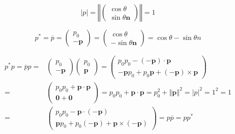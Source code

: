 \documentclass[
]{book}
\theoremstyle{definition}
\theoremstyle{definition}
\theoremstyle{definition}
\theoremstyle{definition}
\theoremstyle{remark}
\begin{document}
\[
\left|p\right|=\left\Vert \begin{pmatrix}\cos\theta\\
\sin\theta\boldsymbol{n}
\end{pmatrix}\right\Vert =1
\]

\[
p^{*}=\overline{p}=\begin{pmatrix}p_{{\scriptscriptstyle 0}}\\
-\boldsymbol{p}
\end{pmatrix}=\begin{pmatrix}\cos\theta\\
-\sin\theta\boldsymbol{n}
\end{pmatrix}=\cos\theta-\sin\theta n
\]

\[
\begin{aligned}
p^{*}p=\overline{p}p= & \begin{pmatrix}p_{{\scriptscriptstyle 0}}\\
-\boldsymbol{p}
\end{pmatrix}\begin{pmatrix}p_{{\scriptscriptstyle 0}}\\
\boldsymbol{p}
\end{pmatrix}=\begin{pmatrix}p_{{\scriptscriptstyle 0}}p_{{\scriptscriptstyle 0}}-\left(-\boldsymbol{p}\right)\cdot\boldsymbol{p}\\
-\boldsymbol{p}p_{{\scriptscriptstyle 0}}+p_{{\scriptscriptstyle 0}}\boldsymbol{p}+\left(-\boldsymbol{p}\right)\times\boldsymbol{p}
\end{pmatrix}\\
= & \begin{pmatrix}p_{{\scriptscriptstyle 0}}p_{{\scriptscriptstyle 0}}+\boldsymbol{p}\cdot\boldsymbol{p}\\
\boldsymbol{0}+\boldsymbol{0}
\end{pmatrix}=p_{{\scriptscriptstyle 0}}p_{{\scriptscriptstyle 0}}+\boldsymbol{p}\cdot\boldsymbol{p}=p_{{\scriptscriptstyle 0}}^{2}+\left\Vert \boldsymbol{p}\right\Vert ^{2}=\left|p\right|^{2}=1^{2}=1\\
= & \begin{pmatrix}p_{{\scriptscriptstyle 0}}p_{{\scriptscriptstyle 0}}-\boldsymbol{p}\cdot\left(-\boldsymbol{p}\right)\\
\boldsymbol{p}p_{{\scriptscriptstyle 0}}+p_{{\scriptscriptstyle 0}}\left(-\boldsymbol{p}\right)+\boldsymbol{p}\times\left(-\boldsymbol{p}\right)
\end{pmatrix}=p\overline{p}=pp^{*}
\end{aligned}
\]
\end{document}
